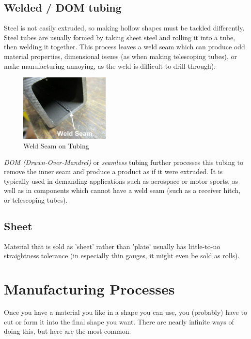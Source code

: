 \documentclass[10pt,letterpaper]{book}
\begin{document}
 \subsection{Welded / DOM tubing}
 Steel is not easily extruded, so making hollow shapes must be tackled differently. Steel tubes are usually formed by taking sheet steel and rolling it into a tube, then welding it together. This process leaves a weld seam which can produce odd material properties, dimensional issues (as when making telescoping tubes), or make manufacturing annoying, as the weld is difficult to drill through). 
 
   \begin{figure}[H]
	\centering
	\includegraphics[width=0.4\textwidth]{imgs/welded_tube_seam.png}
	
	\caption{Weld Seam on Tubing}
\end{figure}
 
 \textit{DOM (Drawn-Over-Mandrel)} or \textit{seamless} tubing further processes this tubing to remove the inner seam and produce a product as if it were extruded. It is typically used in demanding applications such as aerospace or motor sports, as well as in components which cannot have a weld seam (such as a receiver hitch, or telescoping tubes).
 
 \subsection{Sheet}
 Material that is sold as 'sheet' rather than 'plate' usually has little-to-no straightness tolerance (in especially thin gauges, it might even be sold as rolls).
 
 \section{Manufacturing Processes}
 
 Once you have a material you like in a shape you can use, you (probably) have to cut or form it into the final shape you want. There are nearly infinite ways of doing this, but here are the most common.
 
\end{document}
